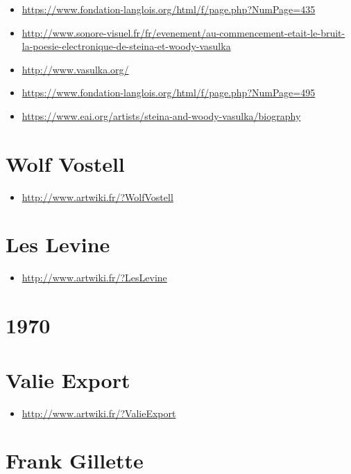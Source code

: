 \documentclass[
  french,
]{book}
\providecommand{\tightlist}{%
  \setlength{\itemsep}{0pt}\setlength{\parskip}{0pt}}
\begin{document}
\begin{itemize}
\tightlist
\item
  \url{https://www.fondation-langlois.org/html/f/page.php?NumPage=435}
\item
  \url{http://www.sonore-visuel.fr/fr/evenement/au-commencement-etait-le-bruit-la-poesie-electronique-de-steina-et-woody-vasulka}
\item
  \url{http://www.vasulka.org/}
\item
  \url{https://www.fondation-langlois.org/html/f/page.php?NumPage=495}
\item
  \url{https://www.eai.org/artists/steina-and-woody-vasulka/biography}
\end{itemize}

\hypertarget{wolf-vostell}{%
\section{Wolf Vostell}\label{wolf-vostell}}

\begin{itemize}
\tightlist
\item
  \url{http://www.artwiki.fr/?WolfVostell}
\end{itemize}

\hypertarget{les-levine}{%
\section{Les Levine}\label{les-levine}}

\begin{itemize}
\tightlist
\item
  \url{http://www.artwiki.fr/?LesLevine}
\end{itemize}

\hypertarget{section}{%
\section{1970}\label{section}}

\hypertarget{valie-export}{%
\section{Valie Export}\label{valie-export}}

\begin{itemize}
\tightlist
\item
  \url{http://www.artwiki.fr/?ValieExport}
\end{itemize}

\hypertarget{frank-gillette}{%
\section{Frank Gillette}\label{frank-gillette}}
\end{document}
